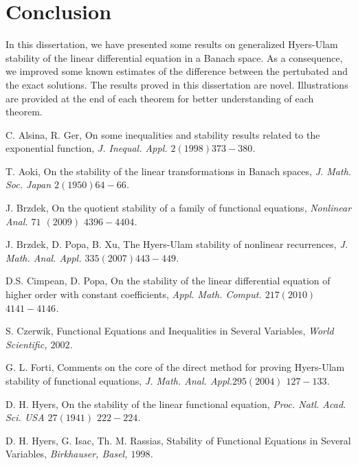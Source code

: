 \documentclass[a4paper,12pt]{report}
\begin{document}
\chapter{Conclusion}
\hspace{0.5cm} In this dissertation, we have presented some results on generalized Hyers-Ulam stability of the linear differential equation in a Banach space. As a consequence, we improved some known estimates of the difference between the pertubated and the exact solutions. The results proved in this dissertation are novel. Illustrations are provided at the end of each theorem for  better understanding of each theorem.

\begin{thebibliography}
\quad  {}C. Alsina, R. Ger, On some inequalities and stability results \linebreak related to the exponential function, \textit{J. Inequal. Appl. $2 (1998)$\linebreak $373-380$.}

T. Aoki, On the stability of the linear transformations in \linebreak Banach spaces, \textit{J. Math. Soc. Japan $2 (1950) 64-66$.}

J. Brzdek, On the quotient stability of a family of functional equations, \textit{Nonlinear Anal. $71$ $(2009)$ $4396-4404$.}

J. Brzdek, D. Popa, B. Xu, The Hyers-Ulam stability of \linebreak nonlinear recurrences, \textit{J. Math. Anal. Appl. $335 (2007) 443-449$.}

D.S. Cimpean, D. Popa, On the stability of the linear differential equation of higher order with constant coefficients, \textit{Appl. Math. Comput. $217 (2010)$ \textit{$4141-4146$.}}

S. Czerwik, Functional Equations and Inequalities in Several Variables, \textit{World Scientific, $2002$.}

G. L. Forti, Comments on the core of the direct method for proving Hyers-Ulam stability of functional equations, \textit{J. Math. Anal. Appl.$ 295 (2004)$ $127-133$.}

D. H. Hyers, On the stability of the linear functional equation, \textit{Proc. Natl. Acad. Sci. USA $27$$ (1941)$ $222-224$.}

D. H. Hyers, G. Isac, Th. M. Rassias, Stability of Functional Equations in Several Variables, \textit{Birkhauser, Basel, $1998$.}


\end{thebibliography}
\end{document}
